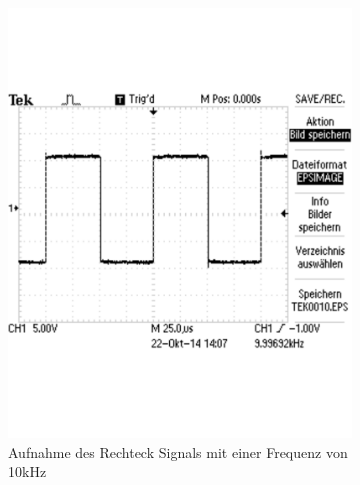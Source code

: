 \documentclass[12pt,a4paper]{article}
\begin{document}
\begin{figure}[H]
\begin{subfigure}[b]{0.28\textwidth}
                \includegraphics[width=\textwidth , scale = 0.4]{2_2_rech_10khz.pdf}
                \caption[Aufnahme des Rechtecksignals mit einer Frequenz von 10kHz]{Aufnahme des Rechteck Signals mit einer Frequenz von 10kHz}
                \label{fig:2_2_rech_10khz}
        \end{subfigure}
        \hfill
        \begin{subfigure}[b]{0.28\textwidth}

\end{subfigure}
\end{figure}
\end{document}
